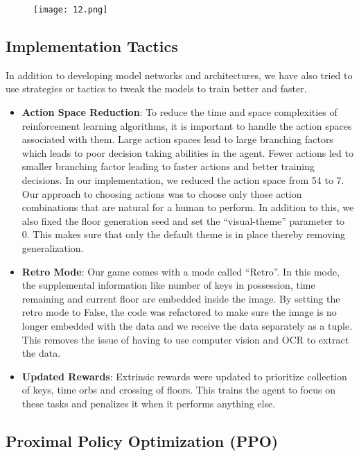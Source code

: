 \documentclass[conference]{IEEEtran}
\begin{document}
\begin{figure}[htp]
    \centering
    \texttt{[image: 12.png]}
\end{figure}

\subsection{\textbf{Implementation Tactics}}

In addition to developing model networks and architectures, we have also tried to use strategies or tactics to tweak the models to train better and faster.

\begin{itemize}
    \item \textbf{Action Space Reduction}: To reduce the time and space complexities of reinforcement learning algorithms, it is important to handle the action spaces associated with them. Large action spaces lead to large branching factors which leads to poor decision taking abilities in the agent. Fewer actions led to smaller branching factor leading to faster actions and better training decisions. In our implementation, we reduced the action space from 54 to 7. Our approach to choosing actions was to choose only those action combinations that are natural for a human to perform. In addition to this, we also fixed the floor generation seed and set the “visual-theme” parameter to 0. This makes sure that only the default theme is in place thereby removing generalization. 
    \item \textbf{Retro Mode}: Our game comes with a mode called “Retro”. In this mode, the supplemental information like number of keys in possession, time remaining and current floor are embedded inside the image. By setting the retro mode to False, the code was refactored to make sure the image is no longer embedded with the data and we receive the data separately as a tuple. This removes the issue of having to use computer vision and OCR to extract the data.
    \item \textbf{Updated Rewards}: Extrinsic rewards were updated to prioritize collection of keys, time orbs and crossing of floors. This trains the agent to focus on these tasks and penalizes it when it performs anything else.
\end{itemize}

\subsection{\textbf{Proximal Policy Optimization (PPO)}}
\end{document}

